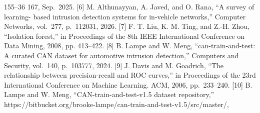 \documentclass[
]{article}
\begin{document}
155--36 167, Sep.~2025. {[}6{]} M. Althunayyan, A. Javed, and O. Rana,
``A survey of learning- based intrusion detection systems for in-vehicle
networks,'' Computer Networks, vol.~277, p.~112031, 2026. {[}7{]} F. T.
Liu, K. M. Ting, and Z.-H. Zhou, ``Isolation forest,'' in Proceedings of
the 8th IEEE International Conference on Data Mining, 2008, pp.
413--422. {[}8{]} B. Lampe and W. Meng, ``can-train-and-test: A curated
CAN dataset for automotive intrusion detection,'' Computers and
Security, vol.~140, p.~103777, 2024. {[}9{]} J. Davis and M. Goadrich,
``The relationship between precision-recall and ROC curves,'' in
Proceedings of the 23rd International Conference on Machine Learning.
ACM, 2006, pp.~233--240. {[}10{]} B. Lampe and W. Meng,
``CAN-train-and-test-v1.5 dataset repository,''
https://bitbucket.org/brooke-lampe/can-train-and-test-v1.5/src/master/,
\end{document}
